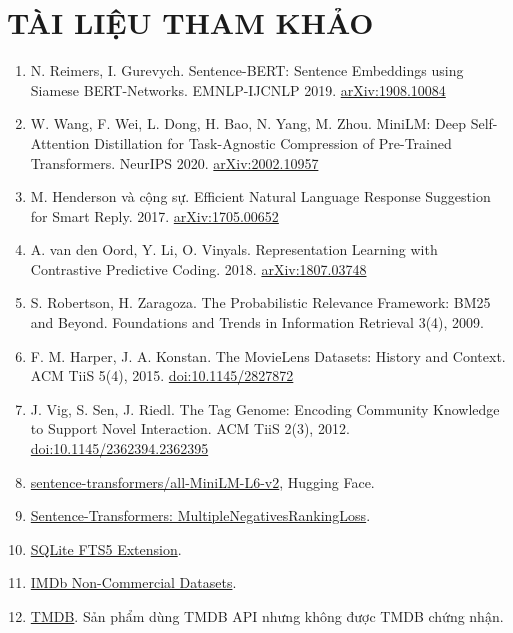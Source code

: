 \documentclass[12pt,a4paper]{article}
\newcommand{\chap}[1]{\clearpage\section{#1}}
\begin{document}
\chap{TÀI LIỆU THAM KHẢO}

\begin{enumerate}
\def\labelenumi{\arabic{enumi}.}
\item N. Reimers, I. Gurevych. Sentence-BERT: Sentence Embeddings using Siamese BERT-Networks. EMNLP-IJCNLP 2019. \href{https://arxiv.org/abs/1908.10084}{arXiv:1908.10084}
\item W. Wang, F. Wei, L. Dong, H. Bao, N. Yang, M. Zhou. MiniLM: Deep Self-Attention Distillation for Task-Agnostic Compression of Pre-Trained Transformers. NeurIPS 2020. \href{https://arxiv.org/abs/2002.10957}{arXiv:2002.10957}
\item M. Henderson và cộng sự. Efficient Natural Language Response Suggestion for Smart Reply. 2017. \href{https://arxiv.org/abs/1705.00652}{arXiv:1705.00652}
\item A. van den Oord, Y. Li, O. Vinyals. Representation Learning with Contrastive Predictive Coding. 2018. \href{https://arxiv.org/abs/1807.03748}{arXiv:1807.03748}
\item S. Robertson, H. Zaragoza. The Probabilistic Relevance Framework: BM25 and Beyond. Foundations and Trends in Information Retrieval 3(4), 2009.
\item F. M. Harper, J. A. Konstan. The MovieLens Datasets: History and Context. ACM TiiS 5(4), 2015. \href{https://doi.org/10.1145/2827872}{doi:10.1145/2827872}
\item J. Vig, S. Sen, J. Riedl. The Tag Genome: Encoding Community Knowledge to Support Novel Interaction. ACM TiiS 2(3), 2012. \href{https://doi.org/10.1145/2362394.2362395}{doi:10.1145/2362394.2362395}
\item \href{https://huggingface.co/sentence-transformers/all-MiniLM-L6-v2}{sentence-transformers/all-MiniLM-L6-v2}, Hugging Face.
\item \href{https://sbert.net/docs/package_reference/sentence_transformer/losses.html\#multiplenegativesrankingloss}{Sentence-Transformers: MultipleNegativesRankingLoss}.
\item \href{https://www.sqlite.org/fts5.html}{SQLite FTS5 Extension}.
\item \href{https://developer.imdb.com/non-commercial-datasets/}{IMDb Non-Commercial Datasets}.
\item \href{https://www.themoviedb.org/}{TMDB}. Sản phẩm dùng TMDB API nhưng không được TMDB chứng nhận.
\end{enumerate}
\end{document}
